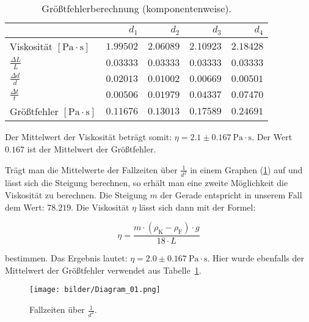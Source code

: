             \begin{table}[H]
                \centering
                \caption{Größtfehlerberechnung (komponentenweise).}
                \vspace*{.5em}
                \begin{tabular}{|l||r|r|r|r|}
                    \hline
                    & $d_{1}$ & $d_{2}$ & $d_{3}$ & $d_{4}$\\
                    \hline \hline
                    Viskosität $[\mathrm{Pa \cdot s}]$ & $1.99502$ & $2.06089$ & $2.10923$ & $2.18428$\\
                    \hline
                    $\frac{\Delta L}{L}$ & $0.03333$ & $0.03333$ & $0.03333$ & $0.03333$\\
                    $\frac{\Delta d}{d}$ & $0.02013$ & $0.01002$ & $0.00669$ & $0.00501$\\
                    $\frac{\Delta t}{t}$ & $0.00506$ & $0.01979$ & $0.04337$ & $0.07470$\\
                    \hline
                    Größtfehler $[\mathrm{Pa \cdot s}]$ & $0.11676$ & $0.13013$ & $0.17589$ & $0.24691$\\
                    \hline
                \end{tabular}
                \label{tab:Groesstfehler}
            \end{table}

            Der Mittelwert der Viskosität beträgt somit: $\eta = 2.1 \pm 0.167\ \mathrm{Pa \cdot s}$.  Der Wert $0.167$ ist der Mittelwert der Größtfehler.

            Trägt man die Mittelwerte der Fallzeiten über $\frac{1}{d^{2}}$ in einem Graphen (\ref{fig:graph_01}) auf und lässt sich die Steigung berechnen, so erhält man eine zweite Möglichkeit die Viskosität zu berechnen. Die Steigung $m$ der Gerade entspricht in unserem Fall dem Wert: $78.219$. Die Viskosität $\eta$ lässt sich dann mit der Formel: 

            \begin{equation}
                \eta = \frac{m \cdot (\rho_{\mathrm{K}} - \rho_{\mathrm{F}}) \cdot g}{18 \cdot L}
            \end{equation}

            bestimmen. Das Ergebnis lautet: $\eta = 2.0 \pm 0.167\ \mathrm{Pa \cdot s}$. Hier wurde ebenfalls der Mittelwert der Größtfehler verwendet aus Tabelle~\ref{tab:Groesstfehler}.

            \begin{figure}
                \centering
                \texttt{[image: bilder/Diagram\_01.png]}
                \caption{Fallzeiten über $\frac{1}{d^{2}}$.}
                \label{fig:graph_01}
            \end{figure}

